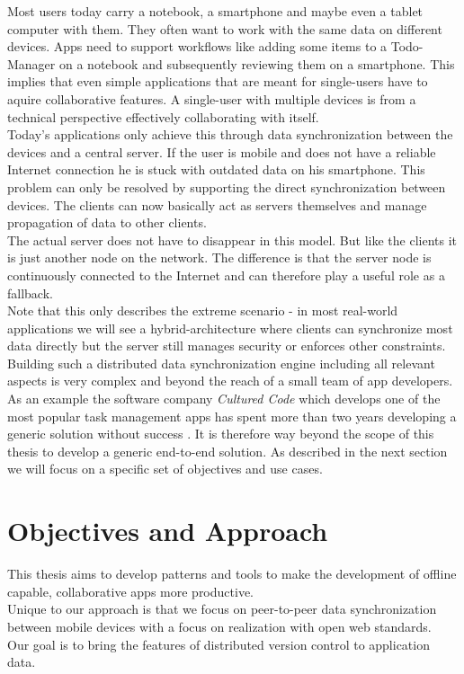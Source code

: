 Most users today carry a notebook, a smartphone and maybe even a tablet computer with them.
They often want to work with the same data on different devices.
Apps need to support workflows like adding some items to a Todo-Manager on a notebook and subsequently reviewing them on a smartphone.
This implies that even simple applications that are meant for single-users have to aquire collaborative features.
A single-user with multiple devices is from a technical perspective effectively collaborating with itself.\\
Today's applications only achieve this through data synchronization between the devices and a central server.
If the user is mobile and does not have a reliable Internet connection he is stuck with outdated data on his smartphone.
This problem can only be resolved by supporting the direct synchronization between devices.
The clients can now basically act as servers themselves and manage propagation of data to other clients.\\
The actual server does not have to disappear in this model.
But like the clients it is just another node on the network.
The difference is that the server node is continuously connected to the Internet and can therefore play a useful role as a fallback.\\
Note that this only describes the extreme scenario - in most real-world applications we will see a hybrid-architecture where clients can synchronize most data directly but the server still manages security or enforces other constraints.\\

Building such a distributed data synchronization engine including all relevant aspects is very complex and beyond the reach of a small team of app developers.
As an example the software company \emph{Cultured Code} which develops one of the most popular task management apps has spent more than two years developing a generic solution without success \cite{things}.
It is therefore way beyond the scope of this thesis to develop a generic end-to-end solution.
As described in the next section we will focus on a specific set of objectives and use cases.

\section{Objectives and Approach}

This thesis aims to develop patterns and tools to make the development of offline capable, collaborative apps more productive.\\
Unique to our approach is that we focus on peer-to-peer data synchronization between mobile devices with a focus on realization with open web standards.\\
Our goal is to bring the features of distributed version control to application data.\\

